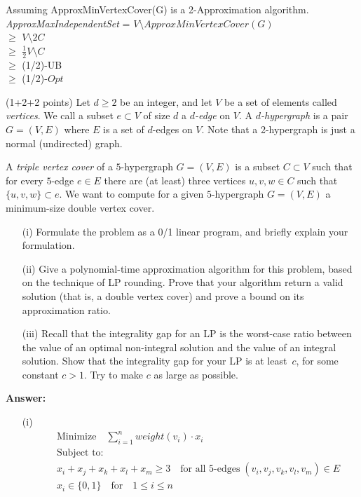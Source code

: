 \documentclass{article}
\renewcommand{\leq}{\leqslant}
\renewcommand{\geq}{\geqslant}
\newcounter{rcounter}
\newenvironment{rlist}%
{\begin{list}{\setnr-\arabic{rcounter}}{\usecounter{rcounter}}}{\end{list}}
\begin{document}
\begin{rlist}
        Assuming ApproxMinVertexCover(G) is a 2-Approximation algorithm. 
        \\\emph{ApproxMaxIndependentSet} = $V \setminus ApproxMinVertexCover(G)$
        \\ $\geq$ $ V \setminus 2C$
        \\ $\geq$ $\frac{1}{2} V \setminus C$
        \\ $\geq$ (1/2)-UB
        \\ $\geq$ (1/2)-$Opt$
        
        \item (1+2+2 points)
        Let $d\geq 2$ be an integer, and let $V$ be a set of elements called \emph{vertices}.
        We call a subset $e\subset V$ of size $d$ a \emph{$d$-edge} on $V$.
        A \emph{$d$-hypergraph} is a pair $G=(V,E)$ where $E$ is a set of $d$-edges on $V$.
        Note that a 2-hypergraph is just a normal (undirected) graph.
        
        A \emph{triple vertex cover} of a $5$-hypergraph $G=(V,E)$ is a subset $C\subset V$ such that
        for every $5$-edge $e\in E$ there are (at least) three vertices $u,v,w\in C$ such that $\{u,v,w\}\subset e$.
        We want to compute for a given $5$-hypergraph $G=(V,E)$ a minimum-size
        double vertex cover.
        \begin{enumerate}
            \item[(i)] Formulate the problem as a 0/1 linear program, and briefly explain
            your formulation.
            \item[(ii)] Give a polynomial-time approximation algorithm for this problem, based on the
            technique of LP rounding. Prove that your algorithm return a valid
            solution (that is, a double vertex cover) and prove a bound on its approximation ratio.
            \item[(iii)] Recall that the integrality gap for an LP is the 
            worst-case ratio between the value
            of an optimal non-integral solution and the value of an integral solution.
            Show that the integrality gap for your LP is at least~$c$, for some
            constant $c>1$. Try to make $c$ as large as possible.
        \end{enumerate}
        \textbf{Answer:}
        \begin{enumerate}
            \item[(i)] 
            \begin{eqnarray*}
                && \textrm{Minimize} \quad \sum_{i=1}^{n}weight(v_i) \cdot x_i \\
                &&\textrm{Subject to:}\\
                && x_i+x_j+x_k+x_l+x_m \geq 3 \quad \textrm{for all 5-edges} \; (v_i, v_j, v_k, v_l, v_m) \in  E\\
                && x_i \in \{0, 1\} \quad \textrm{for} \quad 1\leq i \leq n
            \end{eqnarray*}
            

\end{enumerate}
\end{rlist}
\end{document}
